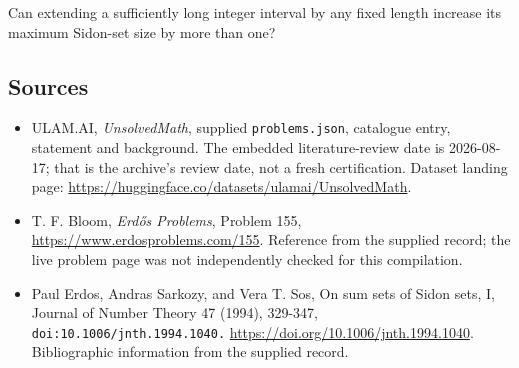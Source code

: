 \documentclass[11pt,a4paper]{article}
\begin{document}
Can extending a sufficiently long integer interval by any fixed length increase its maximum Sidon-set size by more than one?

\subsection{Sources}

{\small

\begin{itemize}

\item[\hypertarget{source:statement:1}{S1}] ULAM.AI, \emph{UnsolvedMath}, supplied \texttt{problems.json}, catalogue entry, statement and background. The embedded literature-review date is 2026-08-17; that is the archive’s review date, not a fresh certification. Dataset landing page: \url{https://huggingface.co/datasets/ulamai/UnsolvedMath}.

\item[\hypertarget{source:statement:2}{S2}] T. F. Bloom, \emph{Erdős Problems}, Problem 155, \url{https://www.erdosproblems.com/155}. Reference from the supplied record; the live problem page was not independently checked for this compilation.

\item[\hypertarget{source:statement:3}{S3}] Paul Erdos, Andras Sarkozy, and Vera T. Sos, On sum sets of Sidon sets, I, Journal of Number Theory 47 (1994), 329-347, \nolinkurl{doi:10.1006/jnth.1994.1040.} \url{https://doi.org/10.1006/jnth.1994.1040}. Bibliographic information from the supplied record.

\end{itemize}

}

\label{end:statement}
\end{document}
